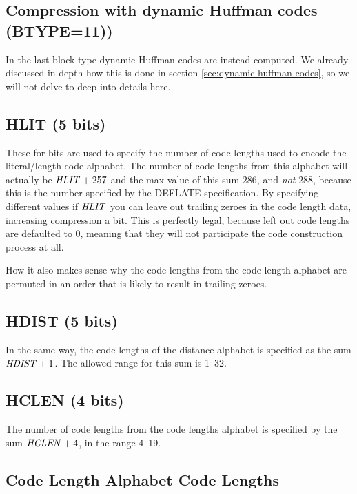 \subsection{Compression with dynamic Huffman codes (BTYPE=11))}

In the last block type dynamic Huffman codes are instead computed. We
already discussed in depth how this is done in section
\ref{sec:dynamic-huffman-codes}, so we will not delve to deep into
details here.

\subsection{HLIT (5 bits)}

These for bits are used to specify the number of code lengths used to
encode the literal/length code alphabet. The number of code lengths
from this alphabet will actually be $\mathit{HLIT} + 257$ and the max
value of this sum $286$, and \textit{not} $288$, because this is the
number specified by the DEFLATE specification. By specifying different
values if $\mathit{HLIT}$ you can leave out trailing zeroes in the code
length data, increasing compression a bit. This is perfectly legal,
because left out code lengths are defaulted to 0, meaning that they
will not participate the code construction process at all.

How it also makes sense why the code lengths from the code length
alphabet are permuted in an order that is likely to result in trailing zeroes.

\subsection{HDIST (5 bits)}

In the same way, the code lengths of the distance alphabet is
specified as the sum $\mathit{HDIST} + 1$. The allowed range for this sum
is 1--32.


\subsection{HCLEN (4 bits)}

The number of code lengths from the code lengths alphabet is specified
by the sum $\mathit{HCLEN} + 4$, in the range 4--19.

\subsection{Code Length Alphabet Code Lengths}

